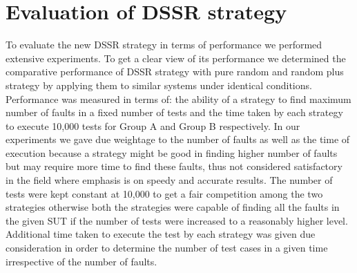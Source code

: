 
\section{Evaluation of DSSR strategy}
To evaluate the new DSSR strategy in terms of performance we performed extensive experiments. To get a clear view of its performance we determined the comparative performance of DSSR strategy with pure random and random plus strategy by applying them to similar systems under identical conditions. Performance was measured in terms of: the ability of a strategy to find maximum number of faults in a fixed number of tests and the time taken by each strategy to execute 10,000 tests for Group A and Group B respectively. In our experiments we gave due weightage to the number of faults as well as the time of execution because a strategy might be good in finding higher number of faults but may require more time to find these faults, thus not considered satisfactory in the field where emphasis is on speedy and accurate results. The number of tests were kept constant at 10,000 to get a fair competition among the two strategies otherwise both the strategies were capable of finding all the faults in the given SUT if the number of tests were increased to a reasonably higher level. Additional time taken to execute the test by each strategy was given due consideration in order to determine the number of test cases in a given time irrespective of the number of faults. 